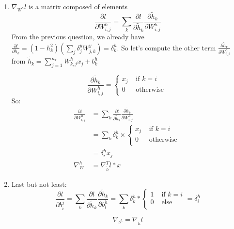 \documentclass{article}
\theoremstyle{plain}%
\theoremstyle{definition}
\theoremstyle{remark}
\begin{document}
\begin{enumerate}
    \item $ \nabla _{W^h} l $ is a matrix composed of elements
          \[
              \frac{\partial l}{\partial W^h _{i,j}} = \sum_{k}^{} \frac{\partial l}{\partial \tilde{h}_k} \frac{\partial \tilde{h}_k}{\partial W^h_{i,j}}
          \]
          From the previous question, we already have $ \frac{\partial l}{\partial h_k} = (1 - h_k^2) (\sum_{j}^{} \delta ^y_j W^y_{j,k}) = \delta_k^h$. So let's compute the other term $ \frac{\partial \tilde{h}_k}{\partial W^h_{i,j}}  $ from $ \tilde{h}_k = \sum_{j=1}^{n_x} W^h_{k,j} x_j + b_k^h $

          \[
              \frac{\partial \tilde{h}_k}{\partial W^h_{i,j}} = \begin{cases}
                  x_j & \text{ if } k = i  \\
                  0   & \text{ otherwise } \\
              \end{cases}
          \]
          So:
          \begin{align*}
              \frac{\partial l}{\partial W^h _{i,j}} & = \sum_{k}^{} \frac{\partial l}{\partial \tilde{h}_k} \frac{\partial \tilde{h}_k}{\partial W^h_{i,j}} \\
                                                     & = \sum_{k}^{}\delta ^h_k \times \begin{cases}
                  x_j & \text{ if } k = i  \\
                  0   & \text{ otherwise } \\
              \end{cases}                                            \\
                                                     & = \delta _i^h x_j                                                                                     \\
              \nabla _W^h                            & = \nabla _{\tilde{h}} ^T l * x
          \end{align*}


    \item Last but not least:
          \[
              \frac{\partial l}{\partial b_i^j} = \sum_{k}^{} \frac{\partial l}{\partial \tilde{h}_k} \frac{\partial \tilde{h}_k}{\partial b_i^h} = \sum_{k}^{}\delta _k^h * \begin{cases}
                  1 & \text{ if } k = i \\
                  0 & \text{ else}      \\
              \end{cases} = \delta ^h_i
          \]

          \[
              \nabla _{b^h} = \nabla _{\tilde{h}} l
          \]

\end{enumerate}
\end{document}
